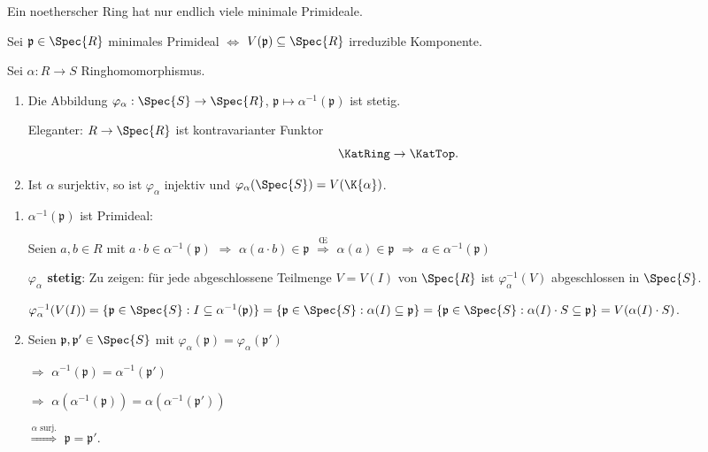 \begin{Folg}
Ein noetherscher Ring hat nur endlich viele minimale Primideale.

\begin{Bew}
Sei $\mathfrak{p} \in \Spec{R}$ minimales Primideal $\Leftrightarrow$ $V(\mathfrak{p}) \subseteq \Spec{R}$ irreduzible Komponente.
\end{Bew}
\end{Folg}

\begin{Prop}
Sei $\alpha : R \rightarrow S$ Ringhomomorphismus.

\begin{enumerate}
\item Die Abbildung $\varphi_\alpha : \Spec{S} \rightarrow \Spec{R}$, $\mathfrak{p} \mapsto \alpha^{-1}(\mathfrak{p})$ ist stetig.

Eleganter: $R \rightarrow \Spec{R}$ ist kontravarianter Funktor
\[
\KatRing \to \KatTop.
\]

\item Ist $\alpha$ surjektiv, so ist $\varphi_\alpha$ injektiv und $\varphi_\alpha(\Spec{S}) = V(\K{\alpha})$.
\end{enumerate}

\begin{Bew}
\begin{enumerate}
\item $\alpha^{-1}(\mathfrak{p})$ ist Primideal:

Seien $a,b \in R$ mit $a \cdot b \in \alpha^{-1}(\mathfrak{p})$ $\Rightarrow$ $\alpha(a \cdot b) \in \mathfrak{p}$ $\overset{\text{\OE}}\Rightarrow$ $\alpha(a) \in \mathfrak{p}$ $\Rightarrow$ $a \in \alpha^{-1}(\mathfrak{p})$

\textbf{$\varphi_\alpha$ stetig}: Zu zeigen: f\"ur jede abgeschlossene Teilmenge $V = V(I)$ von $\Spec{R}$ ist $\varphi_\alpha^{-1}(V)$ abgeschlossen in $\Spec{S}$.

$\varphi_\alpha^{-1}(V(I)) = \{ \mathfrak{p} \in \Spec{S} : I \subseteq
\alpha^{-1}(\mathfrak{p}) \} = \{ \mathfrak{p} \in \Spec{S} : \alpha(I)
\subseteq \mathfrak{p} \} = \{ \mathfrak{p} \in \Spec{S} : \alpha(I) \cdot S
\subseteq \mathfrak{p} \} = V(\alpha(I) \cdot S)$.

\item
Seien $\mathfrak{p}, \mathfrak{p'} \in \Spec{S}$ mit $\varphi_\alpha(\mathfrak{p}) = \varphi_\alpha(\mathfrak{p'})$

$\Rightarrow$ $\alpha^{-1}(\mathfrak{p}) = \alpha^{-1}(\mathfrak{p'})$

$\Rightarrow$ $\alpha(\alpha^{-1}(\mathfrak{p})) = \alpha(\alpha^{-1}(\mathfrak{p'}))$

$\overset{\alpha \text{ surj.}}\Rightarrow$ $\mathfrak{p} = \mathfrak{p'}$.

\end{enumerate}
\end{Bew}
\end{Prop}
